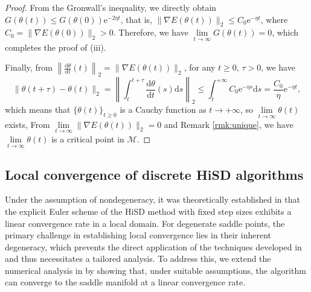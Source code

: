 \documentclass[final]{siamart251216}
\begin{document}
\begin{proof}
From the Gronwall's inequality, we directly obtain 
$G(\theta(t))\leqslant G(\theta(0))\mathrm{e}^{-2\eta t}$,
that is, 
$\|\nabla E(\theta(t))\|_2\leqslant C_0 \mathrm{e}^{-\eta t}$, 
where $C_0=\|\nabla E(\theta(0))\|_2>0$.
Therefore, we have $\lim\limits_{t\to \infty} G (\theta(t))=0$, which completes the proof of (iii).

Finally, from $\left\|\frac{\mathrm{d}\theta}{\mathrm{d}t}(t)\right\|_2 = \|\nabla E(\theta(t))\|_2$, for any $t\geqslant0$, $\tau>0$, we have
\begin{equation*}
\| \theta(t+\tau) - \theta(t)\|_2 = 
\left\|\int_t^{t+\tau} \frac{\mathrm{d}\theta}{\mathrm{d}t}(s) \mathrm{d}s\right\|_2
\leqslant
\int_t^{+\infty}C_0\mathrm{e}^{-\eta s}\mathrm{d}s
=\frac{C_0}{\eta}\mathrm{e}^{-\eta t},
\end{equation*}
which means that $\{\theta(t)\}_{t\geqslant0}$ is a Cauchy function as $t\to +\infty$, so $\lim\limits_{t\to \infty} \theta(t)$ exists, 
From $\lim\limits_{t\to \infty} \|\nabla E(\theta(t))\|_2=0$ and Remark \ref{rmk:unique}, we have $\lim\limits_{t\to \infty} \theta(t)$ is a critical point in $\mathcal{M}$. 
\end{proof}

\subsection{Local convergence of discrete HiSD algorithms}
Under the assumption of nondegeneracy, 
it was theoretically established in \cite{luo2022convergence} that the explicit Euler scheme of the HiSD method with fixed step sizes exhibits a linear convergence rate in a local domain.
For degenerate saddle points, the primary challenge in establishing local convergence lies in their inherent degeneracy, which prevents the direct application of the techniques developed in \cite{luo2022convergence} and thus necessitates a tailored analysis. 
To address this, we extend the numerical analysis in \cite{luo2022convergence} by showing that, under suitable assumptions, the algorithm can converge to the saddle manifold at a linear convergence rate. 
\end{document}
